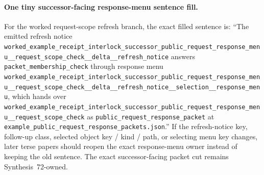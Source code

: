 \documentclass[11pt]{article}
\begin{document}
\paragraph{One tiny successor-facing response-menu sentence fill.}
For the worked request-scope refresh branch, the exact filled sentence is: ``The emitted refresh notice \nolinkurl{worked_example_receipt_interlock_successor_public_request_response_menu__request_scope_check__delta__refresh_notice} answers \nolinkurl{packet_membership_check} through response menu \nolinkurl{worked_example_receipt_interlock_successor_public_request_response_menu__request_scope_check__delta__refresh_notice__selection__response_menu}, which hands over \nolinkurl{worked_example_receipt_interlock_successor_public_request_response_menu__request_scope_check} as \nolinkurl{public_request_response_packet} at \nolinkurl{example_public_request_response_packets.json}.'' If the refresh-notice key, follow-up class, selected object key / kind / path, or selecting menu key changes, later terse papers should reopen the exact response-menu owner instead of keeping the old sentence. The exact successor-facing packet cut remains Synthesis~72-owned.\cite{series:workedexample}
\end{document}

